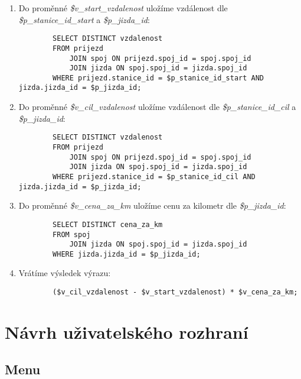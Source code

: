 \documentclass[11pt]{article}
\begin{document}
\begin{enumerate}
    \item Do proměnné \textit{\$v\_start\_vzdalenost} uložíme vzdálenost dle \textit{\$p\_stanice\_id\_start} a \textit{\$p\_jizda\_id}:
    \begin{lstlisting}
        SELECT DISTINCT vzdalenost
        FROM prijezd
            JOIN spoj ON prijezd.spoj_id = spoj.spoj_id
            JOIN jizda ON spoj.spoj_id = jizda.spoj_id
        WHERE prijezd.stanice_id = $p_stanice_id_start AND jizda.jizda_id = $p_jizda_id;
    \end{lstlisting}
    
    \item Do proměnné \textit{\$v\_cil\_vzdalenost} uložíme vzdálenost dle \textit{\$p\_stanice\_id\_cil} a \textit{\$p\_jizda\_id}:
    \begin{lstlisting}
        SELECT DISTINCT vzdalenost
        FROM prijezd
            JOIN spoj ON prijezd.spoj_id = spoj.spoj_id
            JOIN jizda ON spoj.spoj_id = jizda.spoj_id
        WHERE prijezd.stanice_id = $p_stanice_id_cil AND jizda.jizda_id = $p_jizda_id;
    \end{lstlisting}

    \item Do proměnné \textit{\$v\_cena\_za\_km} uložíme cenu za kilometr dle \textit{\$p\_jizda\_id}:
    \begin{lstlisting}
        SELECT DISTINCT cena_za_km
        FROM spoj
            JOIN jizda ON spoj.spoj_id = jizda.spoj_id
        WHERE jizda.jizda_id = $p_jizda_id;
    \end{lstlisting}

    \item Vrátíme výsledek výrazu:
    \begin{lstlisting}
        ($v_cil_vzdalenost - $v_start_vzdalenost) * $v_cena_za_km;
    \end{lstlisting}
\end{enumerate}


\newpage

\section{Návrh uživatelského rozhraní}

\subsection{Menu}
\end{document}
